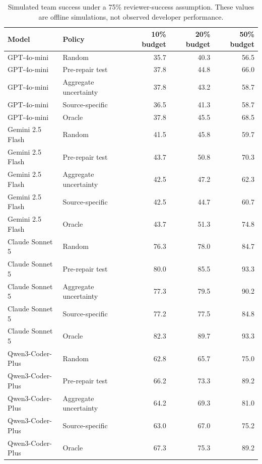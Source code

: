 \begin{table}[t]
\centering
\scriptsize
\caption{Simulated team success under a 75\% reviewer-success assumption. These values are offline simulations, not observed developer performance.}
\label{tab:deferral_budget_final}
\begin{tabular}{llrrr}
\toprule
Model & Policy & 10\% budget & 20\% budget & 50\% budget \\
\midrule
GPT-4o-mini & Random & 35.7 & 40.3 & 56.5 \\
GPT-4o-mini & Pre-repair test & 37.8 & 44.8 & 66.0 \\
GPT-4o-mini & Aggregate uncertainty & 37.8 & 43.2 & 58.7 \\
GPT-4o-mini & Source-specific & 36.5 & 41.3 & 58.7 \\
GPT-4o-mini & Oracle & 37.8 & 45.5 & 68.5 \\
\midrule
Gemini 2.5 Flash & Random & 41.5 & 45.8 & 59.7 \\
Gemini 2.5 Flash & Pre-repair test & 43.7 & 50.8 & 70.3 \\
Gemini 2.5 Flash & Aggregate uncertainty & 42.5 & 47.2 & 62.3 \\
Gemini 2.5 Flash & Source-specific & 42.5 & 44.7 & 60.7 \\
Gemini 2.5 Flash & Oracle & 43.7 & 51.3 & 74.8 \\
\midrule
Claude Sonnet 5 & Random & 76.3 & 78.0 & 84.7 \\
Claude Sonnet 5 & Pre-repair test & 80.0 & 85.5 & 93.3 \\
Claude Sonnet 5 & Aggregate uncertainty & 77.3 & 79.5 & 90.2 \\
Claude Sonnet 5 & Source-specific & 77.2 & 77.5 & 84.8 \\
Claude Sonnet 5 & Oracle & 82.3 & 89.7 & 93.3 \\
\midrule
Qwen3-Coder-Plus & Random & 62.8 & 65.7 & 75.0 \\
Qwen3-Coder-Plus & Pre-repair test & 66.2 & 73.3 & 89.2 \\
Qwen3-Coder-Plus & Aggregate uncertainty & 64.2 & 69.3 & 81.0 \\
Qwen3-Coder-Plus & Source-specific & 63.0 & 67.0 & 75.2 \\
Qwen3-Coder-Plus & Oracle & 67.3 & 75.3 & 89.2 \\
\bottomrule
\end{tabular}
\end{table}
